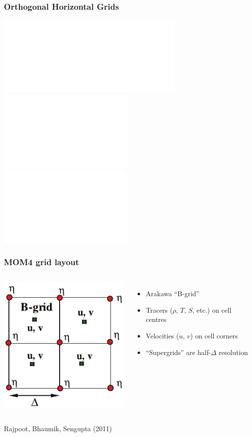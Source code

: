 \documentclass[red]{beamer}
\begin{document}
\begin{frame}
    \frametitle{Orthogonal Horizontal Grids}
    
    \begin{center}
        \includegraphics<1>[width=0.7\textwidth]{merc_tripolar.pdf}
        \includegraphics<2>[width=0.5\textwidth]{nh_tripolar.pdf}
        \includegraphics<2>[width=0.5\textwidth]{sh_tripolar.pdf}
    \end{center}
\end{frame}

\begin{frame}
    \frametitle{MOM4 grid layout}

    \begin{columns}
        \begin{center}
            \includegraphics[width=\textwidth]{b_grid.pdf}
        \end{center}
        \begin{itemize}
            \item Arakawa ``B-grid''
            \item Tracers ($\rho$, $T$, $S$, etc.) on cell centres
            \item Velocities ($u$, $v$) on cell corners
            \item ``Supergrids'' are half-$\Delta$ resolution
        \end{itemize}
    \end{columns}
    {\tiny Rajpoot, Bhaumik, Sengupta (2011)}
\end{frame}
\end{document}
